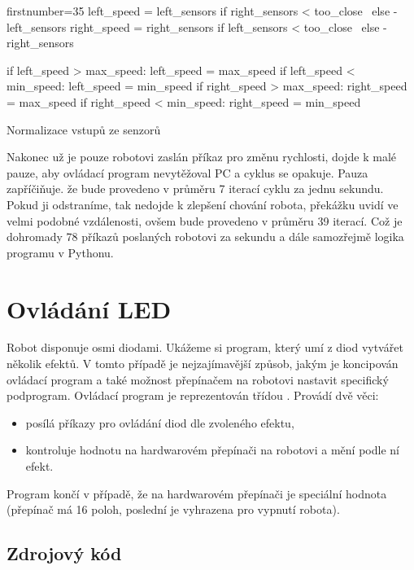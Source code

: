 \begin{listing}[H]
\begin{pyc*}{firstnumber=35}
    left_speed = left_sensors if right_sensors < too_close \
                 else -left_sensors
    right_speed = right_sensors if left_sensors < too_close \
                  else -right_sensors

    if left_speed > max_speed: left_speed = max_speed
    if left_speed < min_speed: left_speed = min_speed
    if right_speed > max_speed: right_speed = max_speed
    if right_speed < min_speed: right_speed = min_speed
\end{pyc*}
\caption{Normalizace vstupů ze senzorů}
\label{normal_prox_s}
\end{listing}

Nakonec už je pouze robotovi zaslán příkaz pro změnu rychlosti, dojde k malé
pauze, aby ovládací program nevytěžoval PC a cyklus se opakuje. Pauza
zapříčiňuje. že bude provedeno v průměru 7 iterací cyklu za jednu sekundu.
Pokud ji odstraníme, tak nedojde k zlepšení chování robota, překážku uvidí ve
velmi podobné vzdálenosti, ovšem bude provedeno v průměru 39 iterací. Což je
dohromady 78 příkazů poslaných robotovi za sekundu a dále samozřejmě logika
programu v Pythonu.

\section{Ovládání LED}
\label{LED}

Robot disponuje osmi diodami. Ukážeme si program, který umí z diod vytvářet
několik efektů. V tomto případě je nejzajímavější způsob, jakým je koncipován
ovládací program a také možnost přepínačem na robotovi nastavit specifický
podprogram.
Ovládací program je reprezentován třídou \code{Disco}. Provádí dvě věci:

\begin{itemize}
    \item posílá příkazy pro ovládání diod dle zvoleného efektu,
    \item kontroluje hodnotu na hardwarovém přepínači na robotovi a mění podle
        ní efekt.
\end{itemize}

Program končí v případě, že na hardwarovém přepínači je speciální hodnota
(přepínač má 16 poloh, poslední je vyhrazena pro vypnutí robota).

\subsection{Zdrojový kód}

